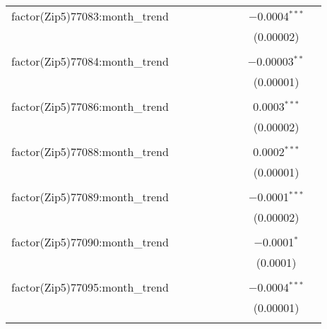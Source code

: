 \begin{table}[H]
{\begin{tabular}{@{\extracolsep{5pt}}lcccccccc}
  factor(Zip5)77083:month\_trend &  &  &  &  &  &  & $-$0.0004$^{***}$ &  \\  

   &  &  &  &  &  &  & (0.00002) &  \\  

   & & & & & & & & \\  

  factor(Zip5)77084:month\_trend &  &  &  &  &  &  & $-$0.00003$^{**}$ &  \\  

   &  &  &  &  &  &  & (0.00001) &  \\  

   & & & & & & & & \\  

  factor(Zip5)77086:month\_trend &  &  &  &  &  &  & 0.0003$^{***}$ &  \\  

   &  &  &  &  &  &  & (0.00002) &  \\  

   & & & & & & & & \\  

  factor(Zip5)77088:month\_trend &  &  &  &  &  &  & 0.0002$^{***}$ &  \\  

   &  &  &  &  &  &  & (0.00001) &  \\  

   & & & & & & & & \\  

  factor(Zip5)77089:month\_trend &  &  &  &  &  &  & $-$0.0001$^{***}$ &  \\  

   &  &  &  &  &  &  & (0.00002) &  \\  

   & & & & & & & & \\  

  factor(Zip5)77090:month\_trend &  &  &  &  &  &  & $-$0.0001$^{*}$ &  \\  

   &  &  &  &  &  &  & (0.0001) &  \\  

   & & & & & & & & \\  

  factor(Zip5)77095:month\_trend &  &  &  &  &  &  & $-$0.0004$^{***}$ &  \\  

   &  &  &  &  &  &  & (0.00001) &  \\  

   & & & & & & & & \\  


\end{tabular}}
\end{table}
